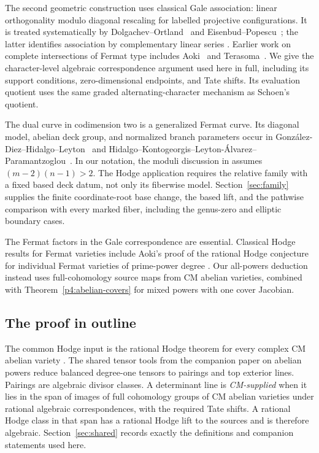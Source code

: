 \documentclass[11pt]{article}
\theoremstyle{plain}
\theoremstyle{definition}
\theoremstyle{remark}
\numberwithin{equation}{section}
\begin{document}
The second geometric construction uses classical Gale association:
linear orthogonality modulo diagonal rescaling for labelled projective
configurations.  It is treated systematically by
Dolgachev--Ortland~\cite{DO} and Eisenbud--Popescu~\cite{EP}; the latter
identifies association by complementary linear series
\cite[preprint, Corollary~3.2]{EP}.
Earlier work on complete intersections of Fermat type includes
Aoki~\cite{AokiCI} and Terasoma~\cite{Terasoma}.  We give the
character-level algebraic correspondence argument used here in full,
including its support conditions, zero-dimensional endpoints, and Tate
shifts.  Its evaluation quotient uses the same graded
alternating-character mechanism as Schoen's quotient.

The dual curve in codimension two is a generalized Fermat curve.
Its diagonal model, abelian deck group, and normalized branch
parameters occur in Gonz\'alez-Diez--Hidalgo--Leyton~\cite{GDL} and
Hidalgo--Kontogeorgis--Leyton-\'Alvarez--Paramantzoglou~\cite{HKLP}.
In our notation, the moduli discussion in
\cite[author proof, Section~4.2]{GDL} assumes \((m-2)(n-1)>2\).
The Hodge application requires the relative family with a fixed based
deck datum, not only its fiberwise model.  Section~\ref{sec:family}
supplies the finite coordinate-root base change, the based lift, and
the pathwise comparison with every marked fiber, including the
genus-zero and elliptic boundary cases.

The Fermat factors in the Gale correspondence are essential.  Classical
Hodge results for Fermat varieties include Aoki's proof of the rational
Hodge conjecture for individual Fermat varieties of prime-power degree
\cite[Corollary~2-3]{AokiFermat}.  Our all-powers deduction instead uses
full-cohomology source maps from CM abelian varieties, combined with
Theorem~\ref{p4:abelian-covers} for mixed powers with one cover Jacobian.

\subsection{The proof in outline}

The common Hodge input is the rational Hodge theorem for every complex
CM abelian variety \cite[Theorem~1.1]{OpenAICM}.  The shared tensor tools
from the companion paper on abelian powers reduce balanced degree-one
tensors to pairings and top exterior lines.  Pairings are algebraic
divisor classes.  A determinant line is \emph{CM-supplied} when it lies
in the span of images of full cohomology groups of CM abelian varieties
under rational algebraic correspondences, with the required Tate
shifts.  A rational Hodge class in that span has a rational Hodge lift
to the sources and is therefore algebraic.  Section~\ref{sec:shared}
records exactly the definitions and companion statements used here.
\end{document}
